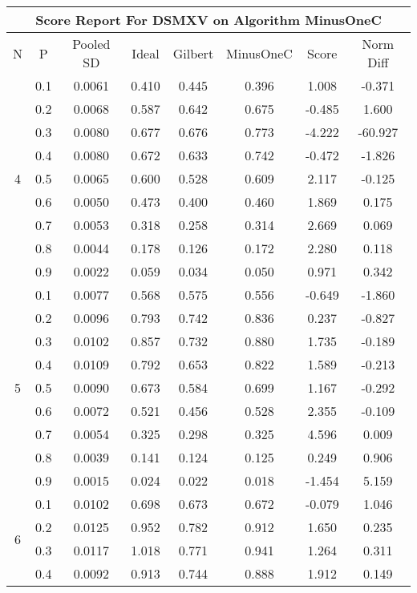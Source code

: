 \documentclass[11pt,a4paper]{report}
\begin{document}
\begin{longtable}{ | c | c || c | c | c | c | c | c | }
\hline
\multicolumn{8}{|c|}{ Score Report For DSMXV on Algorithm MinusOneC} \\
\hline
N & P & Pooled SD &  Ideal &  Gilbert & MinusOneC  & Score & Norm Diff \\
 \hline
 \hline
 \endhead
\multirow{9}{*}{4} & 0.1 & 0.0061 & 0.410 & 0.445 & 0.396 & 1.008 & -0.371 \\
 & 0.2 & 0.0068 & 0.587 & 0.642 & 0.675 & -0.485 & 1.600 \\
 & 0.3 & 0.0080 & 0.677 & 0.676 & 0.773 & -4.222 & -60.927 \\
 & 0.4 & 0.0080 & 0.672 & 0.633 & 0.742 & -0.472 & -1.826 \\
 & 0.5 & 0.0065 & 0.600 & 0.528 & 0.609 & 2.117 & -0.125 \\
 & 0.6 & 0.0050 & 0.473 & 0.400 & 0.460 & 1.869 & 0.175 \\
 & 0.7 & 0.0053 & 0.318 & 0.258 & 0.314 & 2.669 & 0.069 \\
 & 0.8 & 0.0044 & 0.178 & 0.126 & 0.172 & 2.280 & 0.118 \\
 & 0.9 & 0.0022 & 0.059 & 0.034 & 0.050 & 0.971 & 0.342 \\
 \hline
\multirow{9}{*}{5} & 0.1 & 0.0077 & 0.568 & 0.575 & 0.556 & -0.649 & -1.860 \\
 & 0.2 & 0.0096 & 0.793 & 0.742 & 0.836 & 0.237 & -0.827 \\
 & 0.3 & 0.0102 & 0.857 & 0.732 & 0.880 & 1.735 & -0.189 \\
 & 0.4 & 0.0109 & 0.792 & 0.653 & 0.822 & 1.589 & -0.213 \\
 & 0.5 & 0.0090 & 0.673 & 0.584 & 0.699 & 1.167 & -0.292 \\
 & 0.6 & 0.0072 & 0.521 & 0.456 & 0.528 & 2.355 & -0.109 \\
 & 0.7 & 0.0054 & 0.325 & 0.298 & 0.325 & 4.596 & 0.009 \\
 & 0.8 & 0.0039 & 0.141 & 0.124 & 0.125 & 0.249 & 0.906 \\
 & 0.9 & 0.0015 & 0.024 & 0.022 & 0.018 & -1.454 & 5.159 \\
 \hline
\multirow{9}{*}{6} & 0.1 & 0.0102 & 0.698 & 0.673 & 0.672 & -0.079 & 1.046 \\
 & 0.2 & 0.0125 & 0.952 & 0.782 & 0.912 & 1.650 & 0.235 \\
 & 0.3 & 0.0117 & 1.018 & 0.771 & 0.941 & 1.264 & 0.311 \\
 & 0.4 & 0.0092 & 0.913 & 0.744 & 0.888 & 1.912 & 0.149 \\

\end{longtable}
\end{document}
